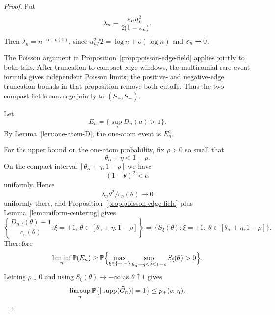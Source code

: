 \begin{proof}
Put
\[
    \lambda_n
    =
    \frac{\varepsilon_nu_n^2}{2(1-\varepsilon_n)}.
\]
Then $\lambda_n=n^{-\alpha+o(1)}$, since $u_n^2/2=\log n+o(\log n)$ and $\varepsilon_n\to0$.

The Poisson argument in Proposition~\ref{prop:poisson-edge-field} applies
jointly to both tails. After truncation to compact edge windows, the
multinomial rare-event formula gives independent Poisson limits; the
positive- and negative-edge truncation bounds in that proposition remove both
cutoffs. Thus the two compact fields converge
jointly to \((S_+,S_-)\).

Let
\[
    E_n=\{\sup_aD_n(a)>1\}.
\]
By Lemma~\ref{lem:one-atom-D}, the one-atom event is $E_n^c$.

For the upper bound on the one-atom probability, fix $\rho>0$ so small that
\[
    \theta_\alpha+\eta<1-\rho.
\]
On the compact interval $[\theta_\alpha+\eta,1-\rho]$ we have
\[
    (1-\theta)^2<\alpha
\]
uniformly. Hence
\[
    \lambda_n\theta^2/c_n(\theta)\to0
\]
uniformly there, and Proposition~\ref{prop:poisson-edge-field} plus Lemma~\ref{lem:uniform-centering} gives
\[
    \left\{
    \frac{D_{n,\xi}(\theta)-1}{c_n(\theta)}
    :
    \xi=\pm1,\ \theta\in[\theta_\alpha+\eta,1-\rho]
    \right\}
    \Rightarrow
    \{S_\xi(\theta):\xi=\pm1,\ \theta\in[\theta_\alpha+\eta,1-\rho]\}.
\]
Therefore
\[
    \liminf_n
    \mathbb P(E_n)
    \ge
    \mathbb P\Bigl\{
        \max_{\xi\in\{+,-\}}
        \sup_{\theta_\alpha+\eta\le\theta\le1-\rho}
        S_\xi(\theta)>0
    \Bigr\}.
\]
Letting $\rho\downarrow0$ and using $S_\xi(\theta)\to-\infty$ as $\theta\uparrow1$ gives
\[
    \limsup_n
    \mathbb P\bigl\{|\operatorname{supp}(\widehat G_n)|=1\bigr\}
    \le
    p_+(\alpha,\eta).
\]


\end{proof}
